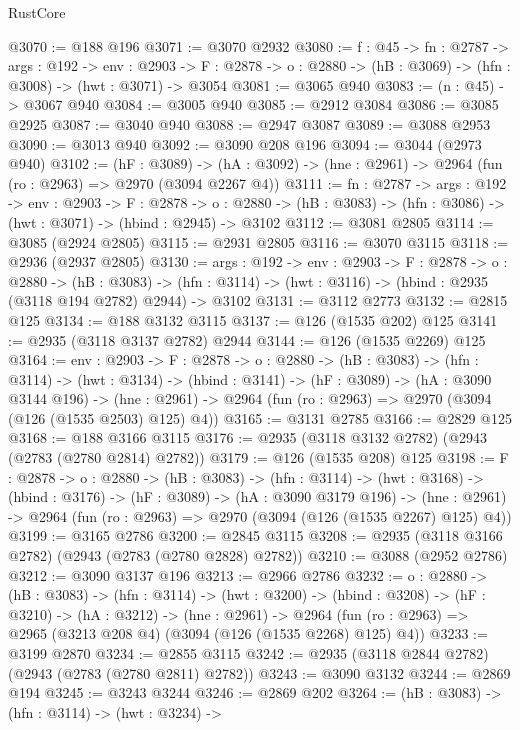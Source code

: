 \begin{lexlean}{RustCore}
\begin{coremodule}
@3070 := @188 @196
@3071 := @3070 @2932
@3080 := {f : @45} ->
  {fn : @2787} ->
  {args : @192} ->
  {env : @2903} ->
  {F : @2878} -> {o : @2880} -> (hB : @3069) -> (hfn : @3008) -> (hwt : @3071) -> @3054
@3081 := @3065 @940
@3083 := (n : @45) -> @3067 @940
@3084 := @3005 @940
@3085 := @2912 @3084
@3086 := @3085 @2925
@3087 := @3040 @940
@3088 := @2947 @3087
@3089 := @3088 @2953
@3090 := @3013 @940
@3092 := @3090 @208 @196
@3094 := @3044 (@2973 @940)
@3102 := (hF : @3089) ->
  (hA : @3092) -> (hne : @2961) -> @2964 (fun (ro : @2963) => @2970 (@3094 @2267 @4))
@3111 := {fn : @2787} ->
  {args : @192} ->
  {env : @2903} ->
  {F : @2878} ->
  {o : @2880} -> (hB : @3083) -> (hfn : @3086) -> (hwt : @3071) -> (hbind : @2945) -> @3102
@3112 := @3081 @2805
@3114 := @3085 (@2924 @2805)
@3115 := @2931 @2805
@3116 := @3070 @3115
@3118 := @2936 (@2937 @2805)
@3130 := {args : @192} ->
  {env : @2903} ->
  {F : @2878} ->
  {o : @2880} ->
  (hB : @3083) ->
  (hfn : @3114) -> (hwt : @3116) -> (hbind : @2935 (@3118 @194 @2782) @2944) -> @3102
@3131 := @3112 @2773
@3132 := @2815 @125
@3134 := @188 @3132 @3115
@3137 := @126 (@1535 @202) @125
@3141 := @2935 (@3118 @3137 @2782) @2944
@3144 := @126 (@1535 @2269) @125
@3164 := {env : @2903} ->
  {F : @2878} ->
  {o : @2880} ->
  (hB : @3083) ->
  (hfn : @3114) ->
  (hwt : @3134) ->
  (hbind : @3141) ->
  (hF : @3089) ->
  (hA : @3090 @3144 @196) ->
  (hne : @2961) -> @2964 (fun (ro : @2963) => @2970 (@3094 (@126 (@1535 @2503) @125) @4))
@3165 := @3131 @2785
@3166 := @2829 @125
@3168 := @188 @3166 @3115
@3176 := @2935 (@3118 @3132 @2782) (@2943 (@2783 (@2780 @2814) @2782))
@3179 := @126 (@1535 @208) @125
@3198 := {F : @2878} ->
  {o : @2880} ->
  (hB : @3083) ->
  (hfn : @3114) ->
  (hwt : @3168) ->
  (hbind : @3176) ->
  (hF : @3089) ->
  (hA : @3090 @3179 @196) ->
  (hne : @2961) -> @2964 (fun (ro : @2963) => @2970 (@3094 (@126 (@1535 @2267) @125) @4))
@3199 := @3165 @2786
@3200 := @2845 @3115
@3208 := @2935 (@3118 @3166 @2782) (@2943 (@2783 (@2780 @2828) @2782))
@3210 := @3088 (@2952 @2786)
@3212 := @3090 @3137 @196
@3213 := @2966 @2786
@3232 := {o : @2880} ->
  (hB : @3083) ->
  (hfn : @3114) ->
  (hwt : @3200) ->
  (hbind : @3208) ->
  (hF : @3210) ->
  (hA : @3212) ->
  (hne : @2961) ->
  @2964 (fun (ro : @2963) => @2965 (@3213 @208 @4) (@3094 (@126 (@1535 @2268) @125) @4))
@3233 := @3199 @2870
@3234 := @2855 @3115
@3242 := @2935 (@3118 @2844 @2782) (@2943 (@2783 (@2780 @2811) @2782))
@3243 := @3090 @3132
@3244 := @2869 @194
@3245 := @3243 @3244
@3246 := @2869 @202
@3264 := (hB : @3083) ->
  (hfn : @3114) ->
  (hwt : @3234) ->

\end{coremodule}
\end{lexlean}
